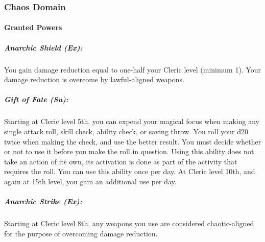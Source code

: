 \subsubsection{Chaos Domain}
\paragraph{Granted Powers}
\subparagraph{Anarchic Shield (Ex):}
You gain damage reduction equal to one-half your Cleric level (minimum 1).
Your damage reduction is overcome by lawful-aligned weapons.

\subparagraph{Gift of Fate (Su):}
Starting at Cleric level 5th, you can expend your magical focus when making any single attack roll, skill check, ability check, or saving throw.
You roll your d20 twice when making the check, and use the better result.
You must decide whether or not to use it before you make the roll in question.
Using this ability does not take an action of its own, its activation is done as part of the activity that requires the roll.
You can use this ability once per day. At Cleric level 10th, and again at 15th level, you gain an additional use per day.

\subparagraph{Anarchic Strike (Ex):}
Starting at Cleric level 8th, any weapons you use are considered chaotic-aligned for the purpose of overcoming damage reduction.
